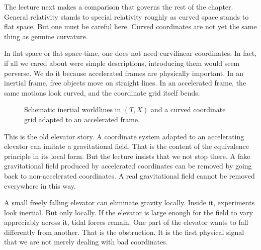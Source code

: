 The lecture next makes a comparison that governs the rest of the chapter. General relativity stands to special relativity roughly as curved space stands to flat space. But one must be careful here. Curved coordinates are not yet the same thing as genuine curvature.

In flat space or flat space-time, one does not need curvilinear coordinates. In fact, if all we cared about were simple descriptions, introducing them would seem perverse. We do it because accelerated frames are physically important. In an inertial frame, free objects move on straight lines. In an accelerated frame, the same motions look curved, and the coordinate grid itself bends.

\begin{figure}[h]
\centering
{}
\caption{Schematic inertial worldlines in \((T,X)\) and a curved coordinate grid adapted to an accelerated frame.}
\end{figure}

This is the old elevator story. A coordinate system adapted to an accelerating elevator can imitate a gravitational field. That is the content of the equivalence principle in its local form. But the lecture insists that we not stop there. A fake gravitational field produced by accelerated coordinates can be removed by going back to non-accelerated coordinates. A real gravitational field cannot be removed everywhere in this way.

A small freely falling elevator can eliminate gravity locally. Inside it, experiments look inertial. But only locally. If the elevator is large enough for the field to vary appreciably across it, tidal forces remain. One part of the elevator wants to fall differently from another. That is the obstruction. It is the first physical signal that we are not merely dealing with bad coordinates.


